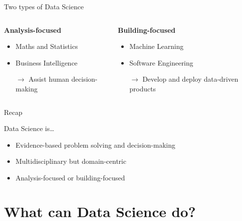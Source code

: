\begin{frame}{Two types of Data Science}
    \begin{columns}
        \begin{column}{0.5\textwidth}
            \begin{center}
                \large\bf%
                Analysis\hyp{}focused
            \end{center}
            \begin{itemize}
                \item Maths and Statistics
                \item Business Intelligence
                \item[$\to$] Assist human decision\hyp{}making
            \end{itemize}
        \end{column}
        \begin{column}{0.5\textwidth}
            \begin{center}
                \large\bf%
                Building\hyp{}focused
            \end{center}
            \begin{itemize}
                \item Machine Learning
                \item Software Engineering
                \item[$\to$] Develop and deploy data\hyp{}driven products
            \end{itemize}
        \end{column}
    \end{columns}
\end{frame}

\begin{frame}{Recap}
    \begin{block}{Data Science is\ldots}
        \begin{itemize}
            \setlength{\itemsep}{0.75em}
            \item \alert{Evidence\hyp{}based problem solving and
                         decision\hyp{}making}
            \item Multidisciplinary but domain\hyp{}centric
            \item Analysis\hyp{}focused or building\hyp{}focused
        \end{itemize}
    \end{block}
\end{frame}

\section{What can Data Science do?}

